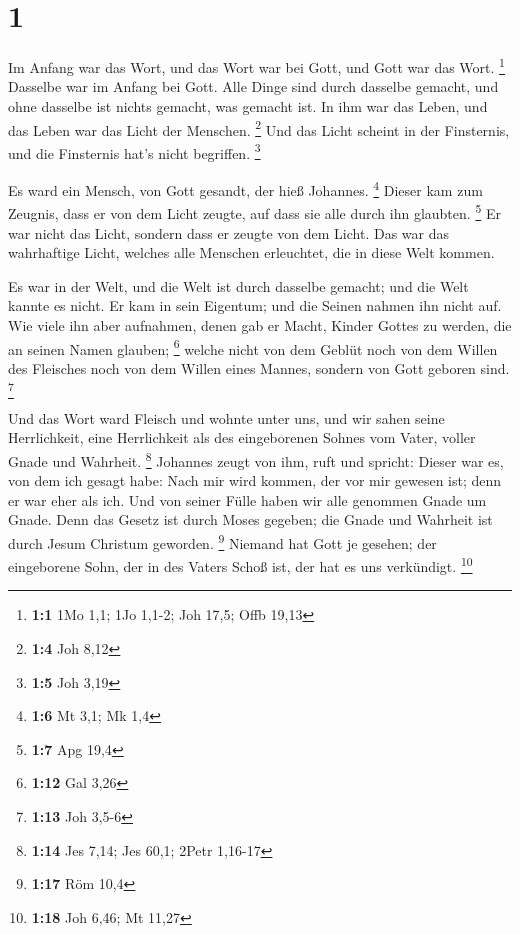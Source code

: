 \hypertarget{section}{%
\section{1}\label{section}}

 Im Anfang war das Wort, und das Wort war bei Gott, und Gott
war das Wort. \footnote{\textbf{1:1} 1Mo 1,1; 1Jo 1,1-2; Joh 17,5; Offb
  19,13}  Dasselbe war im Anfang bei Gott.  Alle
Dinge sind durch dasselbe gemacht, und ohne dasselbe ist nichts gemacht,
was gemacht ist.  In ihm war das Leben, und das Leben war
das Licht der Menschen. \footnote{\textbf{1:4} Joh 8,12} 
Und das Licht scheint in der Finsternis, und die Finsternis hat's nicht
begriffen. \footnote{\textbf{1:5} Joh 3,19}

 Es ward ein Mensch, von Gott gesandt, der hieß Johannes.
\footnote{\textbf{1:6} Mt 3,1; Mk 1,4}  Dieser kam zum
Zeugnis, dass er von dem Licht zeugte, auf dass sie alle durch ihn
glaubten. \footnote{\textbf{1:7} Apg 19,4}  Er war nicht das
Licht, sondern dass er zeugte von dem Licht.  Das war das
wahrhaftige Licht, welches alle Menschen erleuchtet, die in diese Welt
kommen.

 Es war in der Welt, und die Welt ist durch dasselbe
gemacht; und die Welt kannte es nicht.  Er kam in sein
Eigentum; und die Seinen nahmen ihn nicht auf.  Wie viele
ihn aber aufnahmen, denen gab er Macht, Kinder Gottes zu werden, die an
seinen Namen glauben; \footnote{\textbf{1:12} Gal 3,26} 
welche nicht von dem Geblüt noch von dem Willen des Fleisches noch von
dem Willen eines Mannes, sondern von Gott geboren sind. \footnote{\textbf{1:13}
  Joh 3,5-6}

 Und das Wort ward Fleisch und wohnte unter uns, und wir
sahen seine Herrlichkeit, eine Herrlichkeit als des eingeborenen Sohnes
vom Vater, voller Gnade und Wahrheit. \footnote{\textbf{1:14} Jes 7,14;
  Jes 60,1; 2Petr 1,16-17}  Johannes zeugt von ihm, ruft
und spricht: Dieser war es, von dem ich gesagt habe: Nach mir wird
kommen, der vor mir gewesen ist; denn er war eher als ich. 
Und von seiner Fülle haben wir alle genommen Gnade um Gnade.
 Denn das Gesetz ist durch Moses gegeben; die Gnade und
Wahrheit ist durch Jesum Christum geworden. \footnote{\textbf{1:17} Röm
  10,4}  Niemand hat Gott je gesehen; der eingeborene Sohn,
der in des Vaters Schoß ist, der hat es uns verkündigt. \footnote{\textbf{1:18}
  Joh 6,46; Mt 11,27}

